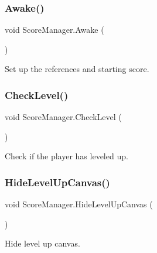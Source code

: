 \subsubsection{\texorpdfstring{Awake()}{Awake()}}
{\footnotesize\ttfamily void Score\+Manager.\+Awake (\begin{DoxyParamCaption}{ }\end{DoxyParamCaption})\hspace{0.3cm}{\ttfamily [private]}}



Set up the references and starting score. 

\mbox{\label{class_score_manager_ac524ca46a457f5258a2632e979640021}} 
\subsubsection{\texorpdfstring{CheckLevel()}{CheckLevel()}}
{\footnotesize\ttfamily void Score\+Manager.\+Check\+Level (\begin{DoxyParamCaption}{ }\end{DoxyParamCaption})\hspace{0.3cm}{\ttfamily [private]}}



Check if the player has leveled up. 

\mbox{\label{class_score_manager_a8a31ef6ffd768ccb2305f81a4830a875}} 
\subsubsection{\texorpdfstring{HideLevelUpCanvas()}{HideLevelUpCanvas()}}
{\footnotesize\ttfamily void Score\+Manager.\+Hide\+Level\+Up\+Canvas (\begin{DoxyParamCaption}{ }\end{DoxyParamCaption})\hspace{0.3cm}{\ttfamily [private]}}



Hide level up canvas. 

\mbox{\label{class_score_manager_a641ee37dc7c0a9d95fb9ea960b10ea37}} 
